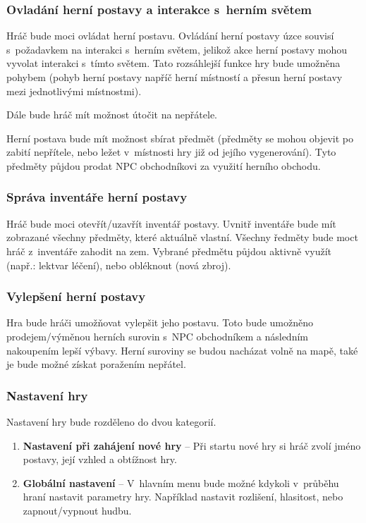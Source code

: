 \documentclass[12pt,a4paper]{article}
\begin{document}
\subsubsection{Ovladání herní postavy a interakce s~herním světem}
Hráč bude moci ovládat herní postavu. Ovládání herní postavy úzce souvisí
s~požadavkem na interakci s~herním světem, jelikož akce herní postavy mohou vyvolat
interakci s~tímto světem. Tato rozsáhlejší funkce hry bude umožněna pohybem
(pohyb herní postavy napříč herní místností a přesun herní postavy mezi
jednotlivými místnostmi).  

Dále bude hráč mít možnost útočit na nepřátele.  

Herní postava bude mít možnost sbírat předmět (předměty se mohou objevit po
zabití nepřítele, nebo ležet v~místnosti hry již od jejího vygenerování). Tyto
předměty půjdou prodat NPC obchodníkovi za využití herního obchodu.

\subsubsection{Správa inventáře herní postavy}
Hráč bude moci otevřít/uzavřít inventář postavy. Uvnitř inventáře bude mít
zobrazané všechny předměty, které aktuálně vlastní. Všechny ředměty bude moct
hráč z~inventáře zahodit na zem. Vybrané předmětu půjdou aktivně využít (např.:
lektvar léčení), nebo obléknout (nová zbroj).

\subsubsection{Vylepšení herní postavy}
Hra bude hráči umožňovat vylepšit jeho postavu. Toto bude umožněno
prodejem/výměnou herních surovin s~NPC obchodníkem a následním nakoupením lepší
výbavy.  Herní suroviny se budou nacházat volně na mapě, také je bude možné
získat poražením nepřátel.

\subsubsection{Nastavení hry}
Nastavení hry bude rozděleno do dvou kategorií.

\begin{enumerate}
  \item{\textbf{Nastavení při zahájení nové hry} -- Při startu nové hry si hráč
    zvolí jméno postavy, její vzhled a obtížnost hry.}
  \item{\textbf{Globální nastavení} -- V~hlavním menu bude možné kdykoli
v~průběhu hraní nastavit parametry hry. Například nastavit rozlišení,
    hlasitost, nebo zapnout/vypnout hudbu.}
\end{enumerate}
\end{document}
